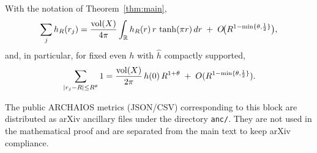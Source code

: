 \begin{corollary}\label{cor:weyl}
With the notation of Theorem~\ref{thm:main},
\[
\sum_j h_R(r_j)
=\frac{\operatorname{vol}(X)}{4\pi}\int_{\mathbb{R}} h_R(r)\, r\,\tanh(\pi r)\,dr
\;+\; O\!\big(R^{1-\min\{\theta,\frac12\}}\big),
\]
and, in particular, for fixed even $h$ with $\widehat h$ compactly supported,
\[
\sum_{|r_j-R|\le R^\theta} 1
=\frac{\operatorname{vol}(X)}{2\pi}\, h(0)\, R^{1+\theta} \;+\; O(R^{1-\min\{\theta,\frac12\}}).
\]
\end{corollary}

\begin{remark}
The public ARCHAIOS metrics (JSON/CSV) corresponding to this block are
distributed as arXiv ancillary files under the directory \texttt{anc/}.
They are not used in the mathematical proof and are separated from the
main text to keep arXiv compliance.
\end{remark}
